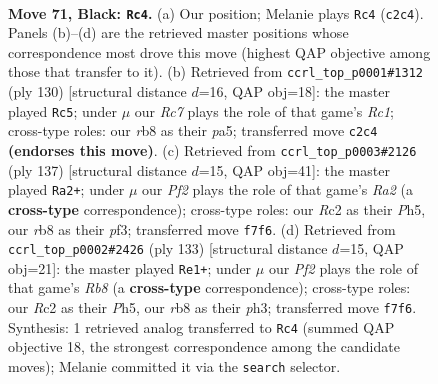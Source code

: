 \documentclass[11pt]{article}
\begin{document}
\clearpage

\begin{figure}[p]\centering
\begin{subfigure}{0.46\textwidth}\centering
\resizebox{\linewidth}{!}{%
\newchessgame
\chessboard[
  setfen={1R6/5p2/3Rp1k1/8/P3PK2/5P2/2r5/8 b - - 34 71},
  showmover=false,
  pgfstyle=straightmove, color=movearrow, markmove={c2-c4}
]}
\caption{}
\end{subfigure}\hfill
\begin{subfigure}{0.46\textwidth}\centering
\resizebox{\linewidth}{!}{%
\newchessgame
\chessboard[
  setfen={8/8/6k1/p5p1/4p3/1r2P1K1/5P2/2R5 w - - 0 66},
  showmover=false,
  pgfstyle=straightmove, color=movearrow, markmove={c1-c5}
]}
\caption{}
\end{subfigure}
\\[4pt]
\begin{subfigure}{0.46\textwidth}\centering
\resizebox{\linewidth}{!}{%
\newchessgame
\chessboard[
  setfen={8/rpR5/5kp1/7p/7P/5PP1/6K1/8 b - - 2 69},
  showmover=false,
  pgfstyle=straightmove, color=movearrow, markmove={a7-a2}
]}
\caption{}
\end{subfigure}\hfill
\begin{subfigure}{0.46\textwidth}\centering
\resizebox{\linewidth}{!}{%
\newchessgame
\chessboard[
  setfen={8/8/3R1pk1/7p/4P3/4KP1P/8/1r6 b - - 19 67},
  showmover=false,
  pgfstyle=straightmove, color=movearrow, markmove={b1-e1}
]}
\caption{}
\end{subfigure}
\caption{\textbf{Move 71, Black: \texttt{Rc4}.} (a) Our position; Melanie plays \texttt{Rc4} (\texttt{c2c4}). Panels (b)--(d) are the retrieved master positions whose correspondence most drove this move (highest QAP objective among those that transfer to it). (b) Retrieved from \texttt{ccrl\_top\_p0001\#1312} (ply 130) [structural distance $d$=16, QAP obj=18]: the master played \texttt{Rc5}; under $\mu$ our \emph{Rc7} plays the role of that game's \emph{Rc1}; cross-type roles: our \emph{r}b8 as their \emph{p}a5; transferred move \texttt{c2c4} \textbf{(endorses this move)}. (c) Retrieved from \texttt{ccrl\_top\_p0003\#2126} (ply 137) [structural distance $d$=15, QAP obj=41]: the master played \texttt{Ra2+}; under $\mu$ our \emph{Pf2} plays the role of that game's \emph{Ra2} (a \textbf{cross-type} correspondence); cross-type roles: our \emph{R}c2 as their \emph{P}h5, our \emph{r}b8 as their \emph{p}f3; transferred move \texttt{f7f6}. (d) Retrieved from \texttt{ccrl\_top\_p0002\#2426} (ply 133) [structural distance $d$=15, QAP obj=21]: the master played \texttt{Re1+}; under $\mu$ our \emph{Pf2} plays the role of that game's \emph{Rb8} (a \textbf{cross-type} correspondence); cross-type roles: our \emph{R}c2 as their \emph{P}h5, our \emph{r}b8 as their \emph{p}h3; transferred move \texttt{f7f6}. Synthesis: 1 retrieved analog transferred to \texttt{Rc4} (summed QAP objective 18, the strongest correspondence among the candidate moves); Melanie committed it via the \texttt{search} selector.}
\label{fig:thought-m141}
\end{figure}
\end{document}
